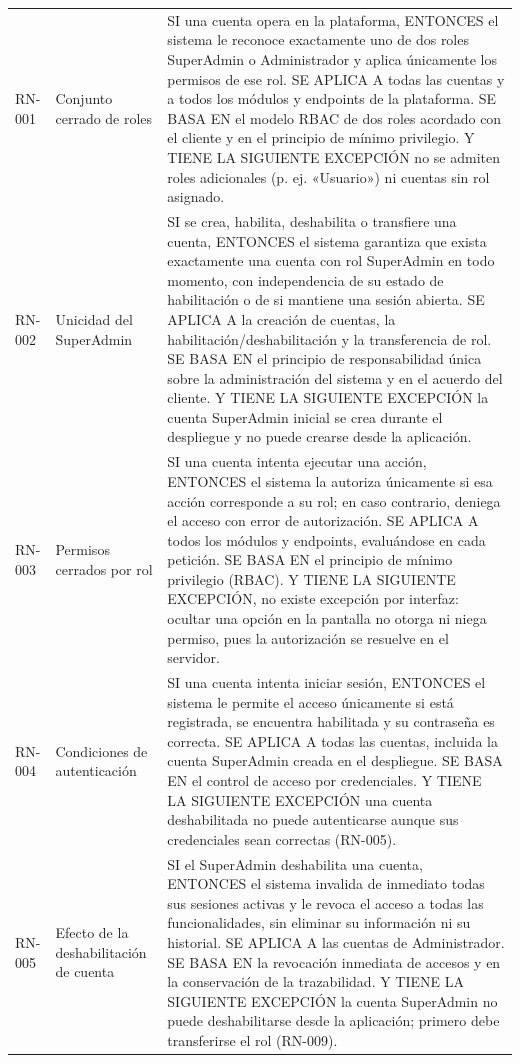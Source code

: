 \begin{longtable}{|C{1.4cm}|L{4.0cm}|L{9.4cm}|}
\hline
{} &  &  \\
\hline
RN-001 & Conjunto cerrado de roles & SI una cuenta opera en la plataforma, ENTONCES el sistema le reconoce exactamente uno de dos roles SuperAdmin o Administrador y aplica únicamente los permisos de ese rol. SE APLICA A todas las cuentas y a todos los módulos y endpoints de la plataforma. SE BASA EN el modelo RBAC de dos roles acordado con el cliente y en el principio de mínimo privilegio. Y TIENE LA SIGUIENTE EXCEPCIÓN no se admiten roles adicionales (p. ej. «Usuario») ni cuentas sin rol asignado. \\
\hline
RN-002 & Unicidad del SuperAdmin & SI se crea, habilita, deshabilita o transfiere una cuenta, ENTONCES el sistema garantiza que exista exactamente una cuenta con rol SuperAdmin en todo momento, con independencia de su estado de habilitación o de si mantiene una sesión abierta. SE APLICA A la creación de cuentas, la habilitación/deshabilitación y la transferencia de rol. SE BASA EN el principio de responsabilidad única sobre la administración del sistema y en el acuerdo del cliente. Y TIENE LA SIGUIENTE EXCEPCIÓN la cuenta SuperAdmin inicial se crea durante el despliegue y no puede crearse desde la aplicación. \\
\hline
RN-003 & Permisos cerrados por rol & SI una cuenta intenta ejecutar una acción, ENTONCES el sistema la autoriza únicamente si esa acción corresponde a su rol; en caso contrario, deniega el acceso con error de autorización. SE APLICA A todos los módulos y endpoints, evaluándose en cada petición. SE BASA EN el principio de mínimo privilegio (RBAC). Y TIENE LA SIGUIENTE EXCEPCIÓN, no existe excepción por interfaz: ocultar una opción en la pantalla no otorga ni niega permiso, pues la autorización se resuelve en el servidor. \\
\hline
RN-004 & Condiciones de autenticación & SI una cuenta intenta iniciar sesión, ENTONCES el sistema le permite el acceso únicamente si está registrada, se encuentra habilitada y su contraseña es correcta. SE APLICA A todas las cuentas, incluida la cuenta SuperAdmin creada en el despliegue. SE BASA EN el control de acceso por credenciales. Y TIENE LA SIGUIENTE EXCEPCIÓN una cuenta deshabilitada no puede autenticarse aunque sus credenciales sean correctas (RN-005). \\
\hline
RN-005 & Efecto de la deshabilitación de cuenta & SI el SuperAdmin deshabilita una cuenta, ENTONCES el sistema invalida de inmediato todas sus sesiones activas y le revoca el acceso a todas las funcionalidades, sin eliminar su información ni su historial. SE APLICA A las cuentas de Administrador. SE BASA EN la revocación inmediata de accesos y en la conservación de la trazabilidad. Y TIENE LA SIGUIENTE EXCEPCIÓN la cuenta SuperAdmin no puede deshabilitarse desde la aplicación; primero debe transferirse el rol (RN-009). \\

\end{longtable}
